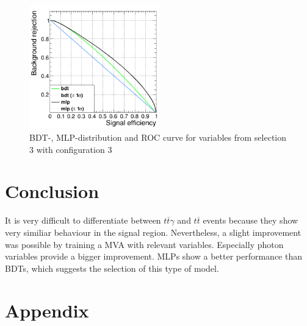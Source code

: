 \documentclass[11pt]{scrartcl}
\begin{document}
\begin{figure}[H]
\begin{minipage}{.5\textwidth}
	  \label{fig:distr_s3_config3_mlp}
	\end{minipage}
	\centering
	\includegraphics[width=0.5\textwidth]{figures/MVA/select3/config3/FOM_selection3_nL10_nT1000_mD5_nC50.png}
	\caption{BDT-, MLP-distribution and ROC curve for variables from selection 3 with configuration 3}
	 \label{fig:ROC_s3_config3}	
	\end{figure}
				
\section{Conclusion}
It is very difficult to differentiate between $t\overline{t}\gamma$ and $t\overline{t}$ events because they show very similiar behaviour in the signal region. Nevertheless, a slight improvement was possible by training a MVA with relevant variables. Especially photon variables provide a bigger improvement. MLPs show a better performance than BDTs, which suggests the selection of this type of model.

\appendix
\section{Appendix}
\end{document}
